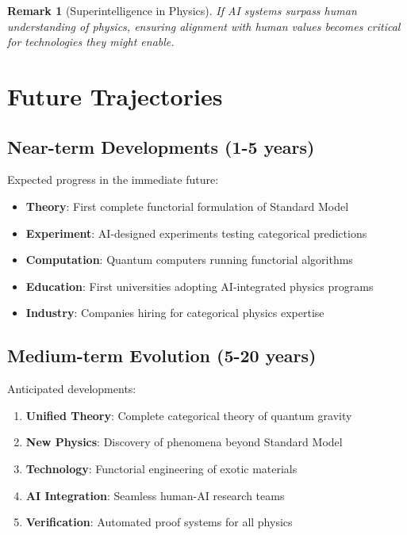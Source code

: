 \documentclass[11pt,a4paper]{article}
\newtheorem{remark}[theorem]{Remark}
\begin{document}
\begin{remark}[Superintelligence in Physics]
If AI systems surpass human understanding of physics, ensuring alignment with human values becomes critical for technologies they might enable.
\end{remark}

\section{Future Trajectories}

\subsection{Near-term Developments (1-5 years)}

Expected progress in the immediate future:

\begin{itemize}
    \item \textbf{Theory}: First complete functorial formulation of Standard Model
    \item \textbf{Experiment}: AI-designed experiments testing categorical predictions
    \item \textbf{Computation}: Quantum computers running functorial algorithms
    \item \textbf{Education}: First universities adopting AI-integrated physics programs
    \item \textbf{Industry}: Companies hiring for categorical physics expertise
\end{itemize}

\subsection{Medium-term Evolution (5-20 years)}

Anticipated developments:

\begin{enumerate}
    \item \textbf{Unified Theory}: Complete categorical theory of quantum gravity
    \item \textbf{New Physics}: Discovery of phenomena beyond Standard Model
    \item \textbf{Technology}: Functorial engineering of exotic materials
    \item \textbf{AI Integration}: Seamless human-AI research teams
    \item \textbf{Verification}: Automated proof systems for all physics
\end{enumerate}
\end{document}

